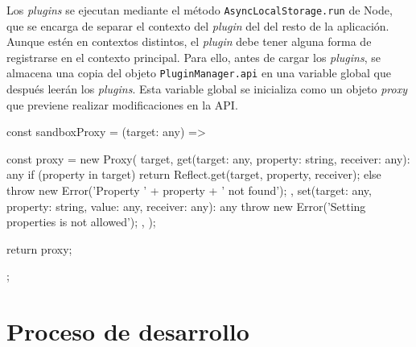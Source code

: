 Los \textit{plugins} se ejecutan mediante el método \texttt{AsyncLocalStorage.run} de Node, que se encarga de separar el contexto del \textit{plugin} del del resto de la aplicación. Aunque estén en contextos distintos, el \textit{plugin} debe tener alguna forma de registrarse en el contexto principal. Para ello, antes de cargar los \textit{plugins}, se almacena una copia del objeto \texttt{PluginManager.api} en una variable global que después leerán los \textit{plugins}. Esta variable global se inicializa como un objeto \textit{proxy} que previene realizar modificaciones en la API.

\begin{center}
\begin{typescript}
const sandboxProxy = (target: any) => {
	const proxy = new Proxy(
		target,
		{
			get(target: any, property: string, receiver: any): any
			{
				if (property in target)
				{
					return Reflect.get(target, property, receiver);
				}
				else
				{
					throw new Error('Property ' + property + ' not found');
				}
			},
			set(target: any, property: string, value: any, receiver: any): any
			{
				throw new Error('Setting properties is not allowed');
			},
		}
	);
	
	return proxy;
};
\end{typescript}
\end{center}


\section{Proceso de desarrollo}

\todo

